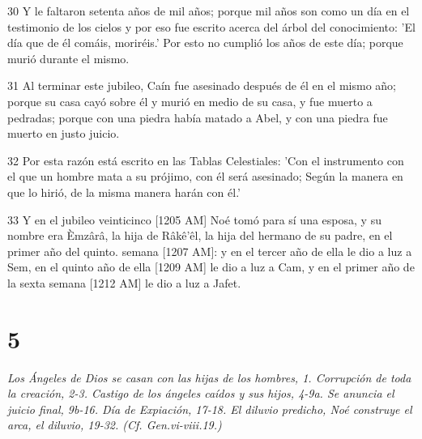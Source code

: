 \par 30 Y le faltaron setenta años de mil años; porque mil años son como un día en el testimonio de los cielos y por eso fue escrito acerca del árbol del conocimiento: 'El día que de él comáis, moriréis.' Por esto no cumplió los años de este día; porque murió durante el mismo.
\par 31 Al terminar este jubileo, Caín fue asesinado después de él en el mismo año; porque su casa cayó sobre él y murió en medio de su casa, y fue muerto a pedradas; porque con una piedra había matado a Abel, y con una piedra fue muerto en justo juicio.
\par 32 Por esta razón está escrito en las Tablas Celestiales: 'Con el instrumento con el que un hombre mata a su prójimo, con él será asesinado; Según la manera en que lo hirió, de la misma manera harán con él.'
\par 33 Y en el jubileo veinticinco [1205 AM] Noé tomó para sí una esposa, y su nombre era \`Emzârâ, la hija de Râkê'êl, la hija del hermano de su padre, en el primer año del quinto. semana [1207 AM]: y en el tercer año de ella le dio a luz a Sem, en el quinto año de ella [1209 AM] le dio a luz a Cam, y en el primer año de la sexta semana [1212 AM] le dio a luz a Jafet.

\chapter{5}

\par \textit{Los Ángeles de Dios se casan con las hijas de los hombres, 1. Corrupción de toda la creación, 2-3. Castigo de los ángeles caídos y sus hijos, 4-9a. Se anuncia el juicio final, 9b-16. Día de Expiación, 17-18. El diluvio predicho, Noé construye el arca, el diluvio, 19-32. (Cf. Gen.vi-viii.19.)}

